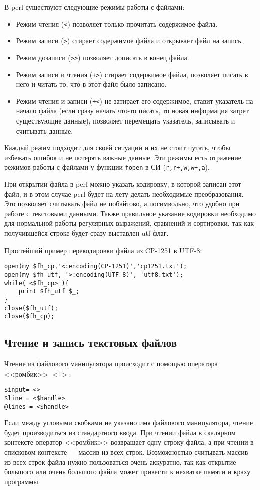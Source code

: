 В perl существуют следующие режимы работы с файлами:
\begin{itemize}[nosep]
  \item Режим чтения (\verb|<|) позволяет только прочитать содержимое файла.
  \item Режим записи (\verb|>|) стирает содержимое файла и открывает файл на запись.
  \item Режим дозаписи (\verb|>>|) позволяет дописать в конец файла.
  \item Режим записи и чтения (\verb|+>|) стирает содержимое файла, позволяет писать в него и читать то, что в этот файл было записано.
  \item Режим чтения и записи (\verb|+<|) не затирает его содержимое, ставит указатель на начало файла (если сразу начать что-то писать, то новая информация затрет существующие данные), позволяет перемещать указатель, записывать и считывать данные.
\end{itemize}
Каждый режим подходит для своей ситуации и их не стоит путать, чтобы избежать ошибок и не потерять важные данные. Эти режимы есть отражение режимов работы с файлами у функции \verb|fopen| в СИ (\verb|r,r+,w,w+,a|).

При открытии файла в perl можно указать кодировку, в которой записан этот файл, и в этом случае perl будет на лету делать необходимые преобразования. Это позволяет считывать файл не побайтово, а посимвольно, что удобно при работе с текстовыми данными. Также правильное указание кодировки необходимо для нормальной работы регулярных выражений, сравнений и сортировки, так как получившейся строке будет сразу выставлен utf-флаг.

Простейший пример перекодировки файла из CP-1251 в UTF-8:
\begin{verbatim}
open(my $fh_cp,'<:encoding(CP-1251)','cp1251.txt');
open(my $fh_utf, '>:encoding(UTF-8)', 'utf8.txt');
while( <$fh_cp> ){
    print $fh_utf $_;
}
close($fh_utf);
close($fh_cp);
\end{verbatim}

\subsection{Чтение и запись текстовых файлов}
Чтение из файлового манипулятора происходит с помощью оператора <<ромбик>> $<>$:
\begin{verbatim}
$input= <>
$line = <$handle>
@lines = <$handle>
\end{verbatim}
Если между угловыми скобками не указано имя файлового манипулятора, чтение будет производиться из стандартного ввода. При чтении файла в скалярном контексте оператор <<ромбик>> возвращает одну строку файла, а при чтении в списковом контексте --- массив из всех строк. Возможностью считывать массив из всех строк файла нужно пользоваться очень аккуратно, так как открытие большого или очень большого файла может привести к нехватке памяти и краху программы.

